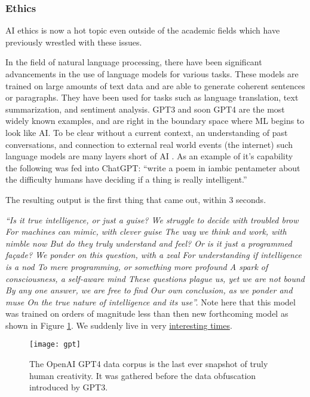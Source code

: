 \subsubsection{Ethics}
AI ethics is now a hot topic even outside of the academic fields which have previously wrestled with these issues.\par
In the field of natural language processing, there have been significant advancements in the use of language models for various tasks. These models are trained on large amounts of text data and are able to generate coherent sentences or paragraphs. They have been used for tasks such as language translation, text summarization, and sentiment analysis. GPT3 and soon GPT4 are the most widely known examples, and are right in the boundary space where ML begins to look like AI. To be clear without a current context, an understanding of past conversations, and connection to external real world events (the internet) such language models are many layers short of AI \cite{elkins2020can, marcus2020gpt}. As an example of it's capability the following was fed into ChatGPT: ``write a poem in iambic pentameter about the difficulty humans have deciding if a thing is really intelligent.''\par
The resulting output is the first thing that came out, within 3 seconds.\par
\textit{``Is it true intelligence, or just a guise?
We struggle to decide with troubled brow
For machines can mimic, with clever guise
The way we think and work, with nimble now
But do they truly understand and feel?
Or is it just a programmed façade?
We ponder on this question, with a zeal
For understanding if intelligence is a nod
To mere programming, or something more profound
A spark of consciousness, a self-aware mind
These questions plague us, yet we are not bound
By any one answer, we are free to find
Our own conclusion, as we ponder and muse
On the true nature of intelligence and its use''.}
Note here that this model was trained on orders of magnitude less than then new forthcoming model as shown in Figure \ref{fig:gpt}. We suddenly live in very \href{https://quoteinvestigator.com/2015/12/18/live/}{interesting times}.\par
\begin{figure}[ht]\centering 	\texttt{[image: gpt]}
	\caption{The OpenAI GPT4 data corpus is the last ever snapshot of truly human creativity. It was gathered before the data obfuscation introduced by GPT3.}
	\label{fig:gpt}
\end{figure}

